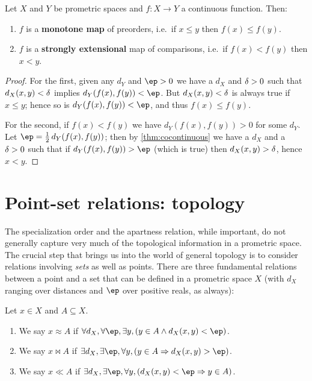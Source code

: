 \documentclass{article}
\begin{document}
\begin{thm}
  Let $X$ and $Y$ be prometric spaces and $f:X\to Y$ a continuous function.
  Then:
  \begin{enumerate}
  \item $f$ is a \textbf{monotone map} of preorders, i.e.\ if $x\le y$ then $f(x)\le f(y)$.
  \item $f$ is a \textbf{strongly extensional} map of comparisons, i.e.\ if $f(x)<f(y)$ then $x<y$.
  \end{enumerate}
\end{thm}
\begin{proof}
  For the first, given any $d_Y$ and $\ep>0$ we have a $d_X$ and $\delta>0$ such that $d_X(x,y)<\delta$ implies $d_Y(f(x),f(y))<\ep$.
  But $d_X(x,y)<\delta$ is always true if $x\le y$; hence so is $d_Y(f(x),f(y))<\ep$, and thus $f(x)\le f(y)$.

  For the second, if $f(x)<f(y)$ we have $d_Y(f(x),f(y))>0$ for some $d_Y$.
  Let $\ep = \frac12 \,d_Y(f(x),f(y))$; then by \cref{thm:cocontinuous} we have a $d_X$ and a $\delta>0$ such that if $d_Y(f(x),f(y))>\ep$ (which is true) then $d_X(x,y)>\delta$, hence $x<y$.
\end{proof}


\section{Point-set relations: topology}
\label{sec:point-set}
\label{sec:topology}

The specialization order and the apartness relation, while important, do not generally capture very much of the topological information in a prometric space.
The crucial step that brings us into the world of general topology is to consider relations involving \emph{sets} as well as points.
There are three fundamental relations between a point and a set that can be defined in a prometric space $X$ (with $d_X$ ranging over distances and $\ep$ over positive reals, as always):

\begin{defn}
  Let $x\in X$ and $A\subseteq X$.
  \begin{enumerate}
  \item We say $x\approx A$ if $\forall d_X, \forall \ep, \exists y, (y\in A \land d_X(x,y)<\ep)$.
  \item We say $x\bowtie A$ if $\exists d_X, \exists \ep, \forall y, (y\in A \Rightarrow d_X(x,y)>\ep)$.
  \item We say $x\ll A$ if $\exists d_X, \exists \ep, \forall y, (d_X(x,y)<\ep \Rightarrow y\in A)$.
  \end{enumerate}
\end{defn}
\end{document}
